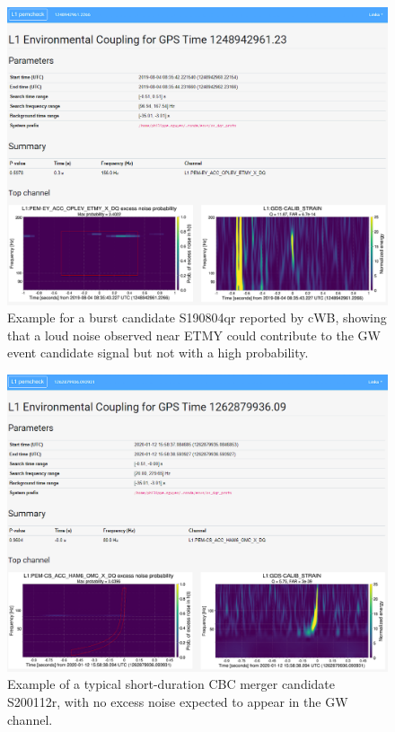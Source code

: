 \begin{figure}[!h]
  \centering
  \includegraphics[width=\textwidth]{figures/appendix/pemcheck-s190804qr.png}
  \caption{Example for a burst candidate S190804qr reported by cWB, showing that a loud noise observed near ETMY could contribute to the GW event candidate signal but not with a high probability.}
  \label{fig:pemcheck-s190804qr}
\end{figure}

\begin{figure}[!h]
  \centering
  \includegraphics[width=\textwidth]{figures/appendix/pemcheck-s200112r.png}
  \caption{Example of a typical short-duration CBC merger candidate S200112r, with no excess noise expected to appear in the GW channel.}
  \label{fig:pemcheck-s200112r}
\end{figure}
